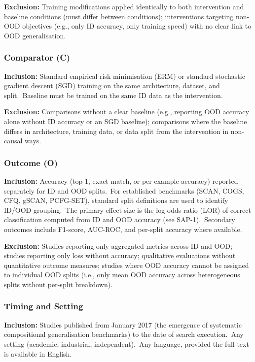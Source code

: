 \textbf{Exclusion:} Training modifications applied identically to both intervention and baseline conditions (must differ between conditions); interventions targeting non-OOD objectives (e.g., only ID accuracy, only training speed) with no clear link to OOD generalisation.

\subsubsection{Comparator (C)}

\textbf{Inclusion:} Standard empirical risk minimisation (ERM) or standard stochastic gradient descent (SGD) training on the same architecture, dataset, and split.\ Baseline must be trained on the same ID data as the intervention.

\textbf{Exclusion:} Comparisons without a clear baseline (e.g., reporting OOD accuracy alone without ID accuracy or an SGD baseline); comparisons where the baseline differs in architecture, training data, or data split from the intervention in non-causal ways.

\subsubsection{Outcome (O)}

\textbf{Inclusion:} Accuracy (top-1, exact match, or per-example accuracy) reported separately for ID and OOD splits.\ For established benchmarks (SCAN, COGS, CFQ, gSCAN, PCFG-SET), standard split definitions are used to identify ID/OOD grouping.\ The primary effect size is the log odds ratio (LOR) of correct classification computed from ID and OOD accuracy (see SAP-1).\ Secondary outcomes include F1-score, AUC-ROC, and per-split accuracy where available.

\textbf{Exclusion:} Studies reporting only aggregated metrics across ID and OOD; studies reporting only loss without accuracy; qualitative evaluations without quantitative outcome measures; studies where OOD accuracy cannot be assigned to individual OOD splits (i.e., only mean OOD accuracy across heterogeneous splits without per-split breakdown).

\subsubsection{Timing and Setting}

\textbf{Inclusion:} Studies published from January 2017 (the emergence of systematic compositional generalisation benchmarks) to the date of search execution.\ Any setting (academic, industrial, independent).\ Any language, provided the full text is available in English.

